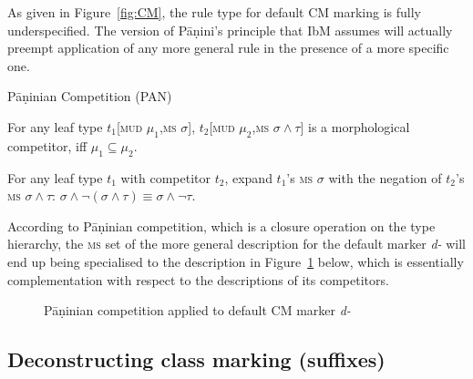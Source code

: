 \documentclass[output=paper]{langsci/langscibook}
\begin{document}
As given in Figure~\ref{fig:CM}, the rule type for default CM marking
is fully underspecified. The version of  Pāṇini's principle that IbM
assumes will actually preempt application of any more general rule in
the presence of a more specific one. 

\ea Pāṇinian Competition (PAN) \hfill \citep{Crysmann:14:OUP} 
  \begin{xlistn}
    \ex For any leaf type $t_1$[\textsc{mud} $\mu_1$,\textsc{ms}
    $\sigma$], $t_2$[\textsc{mud} $\mu_2$,\textsc{ms}
    $\sigma \wedge \tau$] is a morphological competitor, iff
    $\mu_1 \subseteq \mu_2$.
    
    \ex For any leaf type $t_1$ with competitor $t_2$, expand
    $t_1$'s \textsc{ms} $\sigma$ with the negation of $t_2$'s
    \textsc{ms} $\sigma \wedge \tau$:
    $\sigma \wedge \neg (\sigma \wedge \tau) \equiv \sigma \wedge
    \neg \tau$.
  \end{xlistn}
\z

According to Pāṇinian competition, which is a closure operation on the
type hierarchy, the \textsc{ms} set of the more general description
for the default marker \textit{d-} will end up being specialised to
the description in Figure~\ref{fig:Panini:BC} below, which is essentially
complementation with respect to the descriptions of its
competitors. 

\begin{figure}
  \caption{Pāṇinian competition applied to default CM marker \textit{d-}\label{fig:Panini:BC}}
\end{figure}

    
\subsection{Deconstructing class marking (suffixes)}
\end{document}
